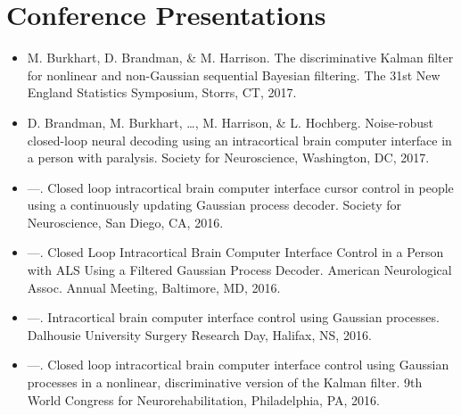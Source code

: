 \section*{Conference Presentations}
\begin{itemize}
    \item M. Burkhart, D. Brandman, \& M. Harrison. The discriminative Kalman filter for nonlinear and non-Gaussian sequential Bayesian filtering. The 31st New England Statistics Symposium, Storrs, CT, 2017.
    \item D. Brandman, M. Burkhart, \ldots, M. Harrison, \& L. Hochberg. Noise-robust closed-loop neural decoding using an intracortical brain computer interface in a person with paralysis. Society for Neuroscience, Washington, DC, 2017.
    \item ---. Closed loop intracortical brain computer interface cursor control in people using a continuously updating Gaussian process decoder. Society for Neuroscience, San Diego, CA, 2016.
    \item ---. Closed Loop Intracortical Brain Computer Interface Control in a Person with ALS Using a Filtered Gaussian Process Decoder. American Neurological Assoc. Annual Meeting, Baltimore, MD, 2016.
    \item ---. Intracortical brain computer interface control using Gaussian processes. Dalhousie University Surgery Research Day, Halifax, NS, 2016.
    \item ---. Closed loop intracortical brain computer interface control using Gaussian processes in a nonlinear, discriminative version of the Kalman filter. 9th World Congress for Neurorehabilitation, Philadelphia, PA, 2016.
\end{itemize}

\newpage

